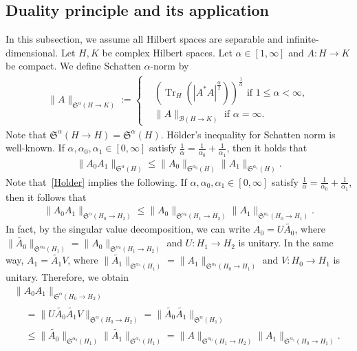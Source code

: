 \documentclass[10pt]{amsart}
\theoremstyle{definition}
\numberwithin{equation}{section}
\newcommand{\CB}{\mathcal{B}}
\newcommand{\FS}{\mathfrak{S}}
\newcommand{\al}{\alpha}
\newcommand{\wt}{\widetilde}
\newcommand{\K}[1]{\left(#1\right)}
\newcommand{\I}{\infty}
\DeclareMathOperator{\Tr}{Tr}
\begin{document}
\subsection{Duality principle and its application} 
In this subsection, we assume all Hilbert spaces are separable and infinite-dimen\-sional. Let $H, K$ be complex Hilbert spaces. Let $\al \in [1,\I]$ and $A: H \to K$ be compact. We define Schatten $\al$-norm by
\begin{align}
\|A\|_{\FS^\al(H\to K)} :=
\begin{cases}
&\K{\Tr_H\left(|A^*A|^{\frac{\al}{2}}\right)}^{\frac{1}{\al}} \text{ if } 1 \le \al <\I,\\
&\|A\|_{\CB(H \to K)} \text{ if } \al = \I.
\end{cases}
\end{align}
Note that $\FS^\al(H \to H)=\FS^\al(H)$. H\"older's inequality for Schatten norm is well-known. If $\al, \al_0, \al_1 \in [0,\I]$ satisfy $\frac{1}{\al}=\frac{1}{\al_0}+\frac{1}{\al_1}$, then it holds that
\begin{align}\label{Holder}
\|A_0 A_1\|_{\FS^{\al}(H)} \le \|A_0\|_{\FS^{\al_0}(H)} \|A_1\|_{\FS^{\al_1}(H)}.
\end{align}
Note that~\eqref{Holder} implies the following. If $\al, \al_0, \al_1 \in [0,\I]$ satisfy $\frac{1}{\al}=\frac{1}{\al_0}+\frac{1}{\al_1}$, then it follows that
\begin{align}\label{g Holder}
\|A_0 A_1\|_{\FS^{\al}(H_0\to H_2)} \le \|A_0\|_{\FS^{\al_0}(H_1 \to H_2)} \|A_1\|_{\FS^{\al_1}(H_0 \to H_1)}.
\end{align}
In fact, by the singular value decomposition, we can write $A_0 = U \wt{A_0}$, where $\|\wt{A_0}\|_{\FS^{\al_0}(H_1)} = \|A_0\|_{\FS^{\al_0}(H_1 \to H_2)}$ and $U:H_1 \to H_2$ is unitary. In the same way, $A_1 = \wt{A_1} V$, where $\|\wt{A_1}\|_{\FS^{\al_1}(H_1)} = \|A_1\|_{\FS^{\al_1}(H_0 \to H_1)}$ and $V:H_0 \to H_1$ is unitary. Therefore, we obtain
\begin{multline}
\|A_0 A_1\|_{\FS^\al(H_0 \to H_2)}\\
\begin{aligned}
 &= \|U \wt{A_0} \wt{A_1} V\|_{\FS^\al(H_0 \to H_2)} = \|\wt{A_0} \wt{A_1}\|_{\FS^\al(H_1)} \\
&\le \|\wt{A_0}\|_{\FS^{\al_0}(H_1)} \|\wt{A_1}\|_{\FS^{\al_1}(H_1)} = \|A\|_{\FS^{\al_0}(H_1 \to H_2)} \|A_1\|_{\FS^{\al_1}(H_0 \to H_1)}.
\end{aligned}
\end{multline}
\end{document}
